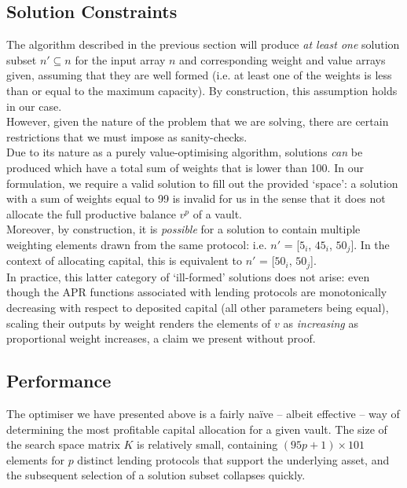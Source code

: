\documentclass{article}
\begin{document}
\subsection{Solution Constraints}
\label{soln-constraints}

\noindent
The algorithm described in the previous section will produce \textit{at least one} solution subset $n' \subseteq n$ for the input array $n$ and corresponding weight and value arrays given, assuming that they are well formed (i.e. at least one of the weights is less than or equal to the maximum capacity). By construction, this assumption holds in our case.\\

\noindent
However, given the nature of the problem that we are solving, there are certain restrictions that we must impose as sanity-checks.\\

\noindent
Due to its nature as a purely value-optimising algorithm, solutions \textit{can} be produced which have a total sum of weights that is lower than 100. In our formulation, we require a valid solution to fill out the provided `space': a solution with a sum of weights equal to 99 is invalid for us in the sense that it does not allocate the full productive balance $v^p$ of a vault.\\

\noindent
Moreover, by construction, it is \textit{possible} for a solution to contain multiple weighting elements drawn from the same protocol: i.e. $n'$ = [$5_i$, $45_i$, $50_j$]. In the context of allocating capital, this is equivalent to $n'$ = [$50_i$, $50_j$].\\

\noindent
In practice, this latter category of `ill-formed' solutions does not arise: even though the APR functions associated with lending protocols are monotonically decreasing with respect to deposited capital (all other parameters being equal), scaling their outputs by weight renders the elements of $v$ as \textit{increasing} as proportional weight increases, a claim we present without proof.

\subsection{Performance}

The optimiser we have presented above is a fairly na\"{i}ve -- albeit effective -- way of determining the most profitable capital allocation for a given vault. The size of the search space matrix $K$ is relatively small, containing $(95p + 1) \times 101$ elements for $p$ distinct lending protocols that support the underlying asset, and the subsequent selection of a solution subset collapses quickly.\\
\end{document}
